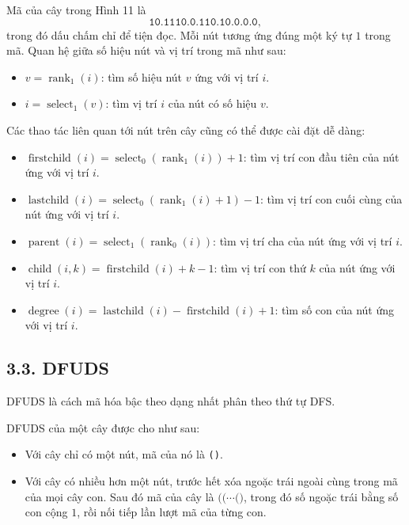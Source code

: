 \documentclass[11pt]{article}
\DeclareMathOperator{\rank}{rank}
\begin{document}
Mã của cây trong Hình 11 là
\[
  \texttt{10.1110.0.110.10.0.0.0},
\]
trong đó dấu chấm chỉ để tiện đọc. Mỗi nút tương ứng đúng một ký tự \(1\)
trong mã. Quan hệ giữa số hiệu nút và vị trí trong mã như sau:

\begin{itemize}
  \item \(v=\rank_1(i)\): tìm số hiệu nút \(v\) ứng với vị trí \(i\).
  \item \(i=\operatorname{select}_1(v)\): tìm vị trí \(i\) của nút có số hiệu
        \(v\).
\end{itemize}

Các thao tác liên quan tới nút trên cây cũng có thể được cài đặt dễ dàng:

\begin{itemize}
  \item \(\operatorname{firstchild}(i)=
        \operatorname{select}_0(\rank_1(i))+1\): tìm vị trí con đầu tiên của
        nút ứng với vị trí \(i\).
  \item \(\operatorname{lastchild}(i)=
        \operatorname{select}_0(\rank_1(i)+1)-1\): tìm vị trí con cuối cùng
        của nút ứng với vị trí \(i\).
  \item \(\operatorname{parent}(i)=\operatorname{select}_1(\rank_0(i))\): tìm
        vị trí cha của nút ứng với vị trí \(i\).
  \item \(\operatorname{child}(i,k)=\operatorname{firstchild}(i)+k-1\): tìm vị
        trí con thứ \(k\) của nút ứng với vị trí \(i\).
  \item \(\operatorname{degree}(i)=
        \operatorname{lastchild}(i)-\operatorname{firstchild}(i)+1\): tìm số
        con của nút ứng với vị trí \(i\).
\end{itemize}

\subsection*{3.3. DFUDS}

DFUDS là cách mã hóa bậc theo dạng nhất phân theo thứ tự DFS.

DFUDS của một cây được cho như sau:

\begin{itemize}
  \item Với cây chỉ có một nút, mã của nó là \texttt{()}.
  \item Với cây có nhiều hơn một nút, trước hết xóa ngoặc trái ngoài cùng
        trong mã của mọi cây con. Sau đó mã của cây là
        \(\texttt{((}\cdots\texttt{()}\), trong đó số ngoặc trái bằng số con
        cộng \(1\), rồi nối tiếp lần lượt mã của từng con.
\end{itemize}
\end{document}
